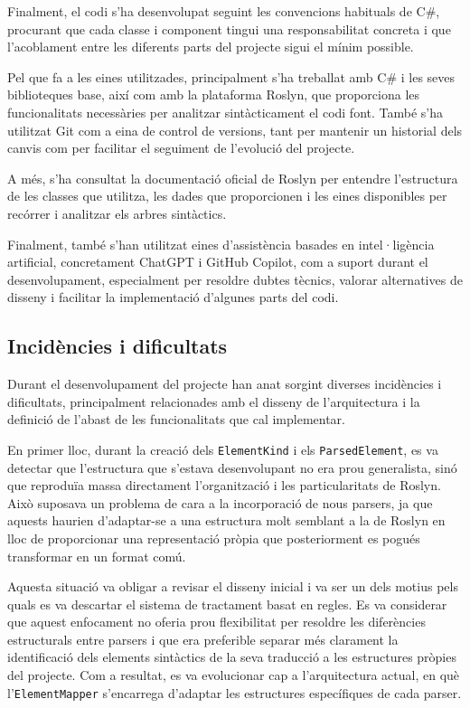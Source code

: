 Finalment, el codi s'ha desenvolupat seguint les convencions habituals de C\#, procurant que cada classe i component tingui una responsabilitat concreta i que l'acoblament entre les diferents parts del projecte sigui el mínim possible.

Pel que fa a les eines utilitzades, principalment s'ha treballat amb C\# i les seves biblioteques base, així com amb la plataforma Roslyn, que proporciona les funcionalitats necessàries per analitzar sintàcticament el codi font. També s'ha utilitzat Git com a eina de control de versions, tant per mantenir un historial dels canvis com per facilitar el seguiment de l'evolució del projecte.

A més, s'ha consultat la documentació oficial de Roslyn per entendre l'estructura de les classes que utilitza, les dades que proporcionen i les eines disponibles per recórrer i analitzar els arbres sintàctics.

Finalment, també s'han utilitzat eines d'assistència basades en intel·ligència artificial, concretament ChatGPT i GitHub Copilot, com a suport durant el desenvolupament, especialment per resoldre dubtes tècnics, valorar alternatives de disseny i facilitar la implementació d'algunes parts del codi.

\subsection*{Incidències i dificultats}

Durant el desenvolupament del projecte han anat sorgint diverses incidències i dificultats, principalment relacionades amb el disseny de l'arquitectura i la definició de l'abast de les funcionalitats que cal implementar.

En primer lloc, durant la creació dels \texttt{ElementKind} i els \texttt{ParsedElement}, es va detectar que l'estructura que s'estava desenvolupant no era prou generalista, sinó que reproduïa massa directament l'organització i les particularitats de Roslyn. Això suposava un problema de cara a la incorporació de nous parsers, ja que aquests haurien d'adaptar-se a una estructura molt semblant a la de Roslyn en lloc de proporcionar una representació pròpia que posteriorment es pogués transformar en un format comú.

Aquesta situació va obligar a revisar el disseny inicial i va ser un dels motius pels quals es va descartar el sistema de tractament basat en regles. Es va considerar que aquest enfocament no oferia prou flexibilitat per resoldre les diferències estructurals entre parsers i que era preferible separar més clarament la identificació dels elements sintàctics de la seva traducció a les estructures pròpies del projecte. Com a resultat, es va evolucionar cap a l'arquitectura actual, en què l'\texttt{ElementMapper} s'encarrega d'adaptar les estructures específiques de cada parser.


